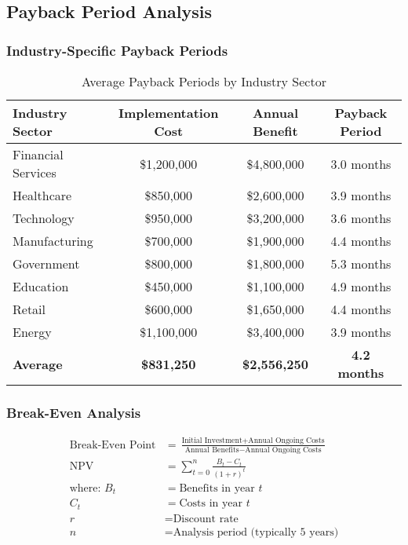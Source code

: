 \documentclass[11pt,a4paper]{article}
\begin{document}
\subsection{Payback Period Analysis}

\subsubsection{Industry-Specific Payback Periods}

\begin{table}[H]
\centering
\caption{Average Payback Periods by Industry Sector}
\begin{tabular}{lccc}
\toprule
Industry Sector & Implementation Cost & Annual Benefit & Payback Period \\
\midrule
Financial Services & \$1,200,000 & \$4,800,000 & 3.0 months \\
Healthcare & \$850,000 & \$2,600,000 & 3.9 months \\
Technology & \$950,000 & \$3,200,000 & 3.6 months \\
Manufacturing & \$700,000 & \$1,900,000 & 4.4 months \\
Government & \$800,000 & \$1,800,000 & 5.3 months \\
Education & \$450,000 & \$1,100,000 & 4.9 months \\
Retail & \$600,000 & \$1,650,000 & 4.4 months \\
Energy & \$1,100,000 & \$3,400,000 & 3.9 months \\
\midrule
\textbf{Average} & \textbf{\$831,250} & \textbf{\$2,556,250} & \textbf{4.2 months} \\
\bottomrule
\end{tabular}
\end{table}

\subsubsection{Break-Even Analysis}

\begin{align}
\text{Break-Even Point} &= \frac{\text{Initial Investment} + \text{Annual Ongoing Costs}}{\text{Annual Benefits} - \text{Annual Ongoing Costs}} \\
\text{NPV} &= \sum_{t=0}^{n} \frac{B_t - C_t}{(1 + r)^t} \\
\text{where: } B_t &= \text{Benefits in year } t \\
C_t &= \text{Costs in year } t \\
r &= \text{Discount rate} \\
n &= \text{Analysis period (typically 5 years)}
\end{align}
\end{document}
